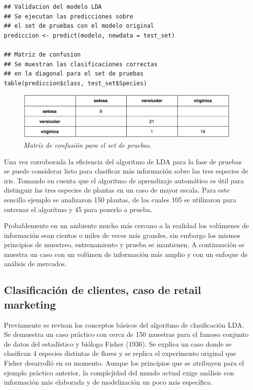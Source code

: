 \documentclass[letterpaper,12pt, spanish, oneside]{book} %
\begin{document}
\begin{lstlisting}
## Validacion del modelo LDA
## Se ejecutan las predicciones sobre
## el set de pruebas con el modelo original 
prediccion <- predict(modelo, newdata = test_set)

## Matriz de confusion
## Se muestran las clasificaciones correctas
## en la diagonal para el set de pruebas
table(prediccion$class, test_set$Species)
\end{lstlisting}

\begin{figure}[H]
\centering
\includegraphics[width=1\textwidth]{fase9.png}
\caption{\label{fig:frog2}\textit{Matriz de confusión para el set de pruebas.}}
\end{figure}

Una vez corroborada la eficiencia del algoritmo de LDA para la fase de pruebas se puede considerar listo para clasificar más información sobre las tres especies de iris. Tomando en cuenta que el algoritmo de aprendizaje automático es útil para distinguir las tres especies de plantas en un caso de mayor escala. Para este sencillo ejemplo se analizaron 150 plantas, de las cuales 105 se utilizaron para entrenar el algoritmo y 45 para ponerlo a prueba. 

Probablemente en un ambiente mucho más cercano a la realidad los volúmenes de información sean cientos o miles de veces más grandes, sin embargo los mismos principios de muestreo, entrenamiento y prueba se mantienen. A continuación se muestra un caso con un volúmen de información más amplio y con un enfoque de análisis de mercados.

\subsection{Clasificación de clientes, caso de retail marketing}

Previamente se revisan los conceptos básicos del algoritmo de clasificación LDA. Se demuestra un caso práctico con cerca de 150 muestras para el famoso conjunto de datos del estadístico y biólogo Fisher (1936). Se explica un caso donde se clasifican 4 especies distintas de flores y se replica el experimento original que Fisher desarrolló en su momento. Aunque los principios que se atribuyen para el ejemplo práctico anterior, la complejidad del mundo actual exige análisis con información más elaborada y de modelización un poco más específica.
\end{document}
